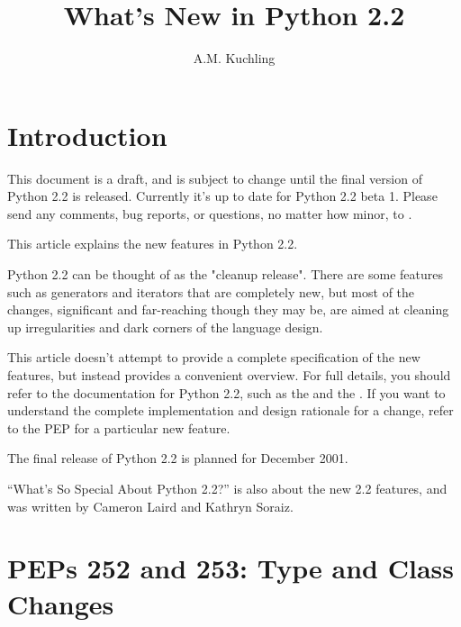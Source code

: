 \documentclass{howto}
\title{What's New in Python 2.2}
\author{A.M. Kuchling}
\begin{document}
\maketitle\tableofcontents

\section{Introduction}

{\large This document is a draft, and is subject to change until the
final version of Python 2.2 is released.  Currently it's up to date
for Python 2.2 beta 1.  Please send any comments, bug reports, or
questions, no matter how minor, to .
}

This article explains the new features in Python 2.2.

Python 2.2 can be thought of as the "cleanup release".  There are some
features such as generators and iterators that are completely new, but
most of the changes, significant and far-reaching though they may be,
are aimed at cleaning up irregularities and dark corners of the
language design.

This article doesn't attempt to provide a complete specification of
the new features, but instead provides a convenient overview.  For
full details, you should refer to the documentation for Python 2.2,
such as the
 and the
.   
If you want to understand the complete implementation and design
rationale for a change, refer to the PEP for a particular new feature.

The final release of Python 2.2 is planned for December 2001.

\begin{seealso}

{``What's So Special About Python 2.2?'' is also about the new 2.2
features, and was written by Cameron Laird and Kathryn Soraiz.}

\end{seealso}


\section{PEPs 252 and 253: Type and Class Changes}
\end{document}
